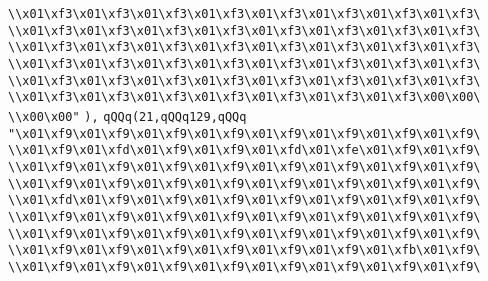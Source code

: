 \verb|\\x01\xf3\x01\xf3\x01\xf3\x01\xf3\x01\xf3\x01\xf3\x01\xf3\x01\xf3\|\newline
\verb|\\x01\xf3\x01\xf3\x01\xf3\x01\xf3\x01\xf3\x01\xf3\x01\xf3\x01\xf3\|\newline
\verb|\\x01\xf3\x01\xf3\x01\xf3\x01\xf3\x01\xf3\x01\xf3\x01\xf3\x01\xf3\|\newline
\verb|\\x01\xf3\x01\xf3\x01\xf3\x01\xf3\x01\xf3\x01\xf3\x01\xf3\x01\xf3\|\newline
\verb|\\x01\xf3\x01\xf3\x01\xf3\x01\xf3\x01\xf3\x01\xf3\x01\xf3\x01\xf3\|\newline
\verb|\\x01\xf3\x01\xf3\x01\xf3\x01\xf3\x01\xf3\x01\xf3\x01\xf3\x00\x00\|\newline
\verb|\\x00\x00"|\newline
\verb|),|\newline
\verb|qQQq(21,qQQq129,qQQq|\newline
\verb|"\x01\xf9\x01\xf9\x01\xf9\x01\xf9\x01\xf9\x01\xf9\x01\xf9\x01\xf9\|\newline
\verb|\\x01\xf9\x01\xfd\x01\xf9\x01\xf9\x01\xfd\x01\xfe\x01\xf9\x01\xf9\|\newline
\verb|\\x01\xf9\x01\xf9\x01\xf9\x01\xf9\x01\xf9\x01\xf9\x01\xf9\x01\xf9\|\newline
\verb|\\x01\xf9\x01\xf9\x01\xf9\x01\xf9\x01\xf9\x01\xf9\x01\xf9\x01\xf9\|\newline
\verb|\\x01\xfd\x01\xf9\x01\xf9\x01\xf9\x01\xf9\x01\xf9\x01\xf9\x01\xf9\|\newline
\verb|\\x01\xf9\x01\xf9\x01\xf9\x01\xf9\x01\xf9\x01\xf9\x01\xf9\x01\xf9\|\newline
\verb|\\x01\xf9\x01\xf9\x01\xf9\x01\xf9\x01\xf9\x01\xf9\x01\xf9\x01\xf9\|\newline
\verb|\\x01\xf9\x01\xf9\x01\xf9\x01\xf9\x01\xf9\x01\xf9\x01\xfb\x01\xf9\|\newline
\verb|\\x01\xf9\x01\xf9\x01\xf9\x01\xf9\x01\xf9\x01\xf9\x01\xf9\x01\xf9\|\newline
